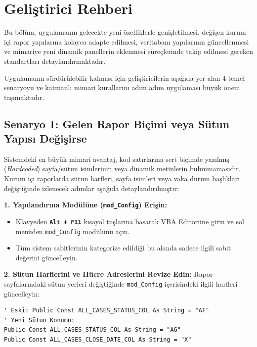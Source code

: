 \chapter{Geliştirici Rehberi}

Bu bölüm, uygulamanın gelecekte yeni özelliklerle genişletilmesi, değişen kurum içi rapor yapılarına kolayca adapte edilmesi, veritabanı yapılarının güncellenmesi ve mimariye yeni dinamik panellerin eklenmesi süreçlerinde takip edilmesi gereken standartları detaylandırmaktadır.

Uygulamanın sürdürülebilir kalması için geliştiricilerin aşağıda yer alan 4 temel senaryoyu ve katmanlı mimari kurallarını adım adım uygulaması büyük önem taşımaktadır.

\vspace{0.4cm}

\section{Senaryo 1: Gelen Rapor Biçimi veya Sütun Yapısı Değişirse}

Sistemdeki en büyük mimari avantaj, kod satırlarına sert biçimde yazılmış (\textit{Hardcoded}) sayfa/sütun isimlerinin veya dinamik metinlerin bulunmamasıdır. Kurum içi raporlarda sütun harfleri, sayfa isimleri veya vaka durum başlıkları değiştiğinde izlenecek adımlar aşağıda detaylandırılmıştır:

\vspace{0.2cm}

\textbf{\textcolor{primary}{1. Yapılandırma Modülüne (\texttt{mod\_Config}) Erişin:}}
\begin{itemize}\setlength{\itemsep}{2pt}
    \item Klavyeden \textbf{\texttt{Alt + F11}} kısayol tuşlarına basarak VBA Editörüne girin ve sol menüden \texttt{mod\_Config} modülünü açın.
    \item Tüm sistem sabitlerinin kategorize edildiği bu alanda sadece ilgili sabit değerini güncelleyin.
\end{itemize}

\vspace{0.15cm}

\textbf{\textcolor{primary}{2. Sütun Harflerini ve Hücre Adreslerini Revize Edin:}}
Rapor sayfalarındaki sütun yerleri değiştiğinde \texttt{mod\_Config} içerisindeki ilgili harfleri güncelleyin:
\begin{lstlisting}[caption={Sütun Sabitlerinin Güncellenmesi}]
' Eski: Public Const ALL_CASES_STATUS_COL As String = "AF"
' Yeni Sütun Konumu:
Public Const ALL_CASES_STATUS_COL As String = "AG"
Public Const ALL_CASES_CLOSE_DATE_COL As String = "X"
\end{lstlisting}

